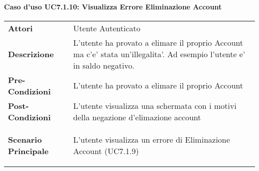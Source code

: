 \paragraph{Caso d'uso UC7.1.10:  Visualizza Errore Eliminazione Account}
\label{UC7_1_10}

\begin{tabular}{ l | p{11cm}}
	\hline
	\rowcolor{Gray}
	 \multicolumn{2}{c}{UC7.1.10 - Visualizza Errore Eliminazione Account} \\
	 \hline
	\textbf{Attori} & Utente Autenticato \\
	\textbf{Descrizione} & L'utente ha provato a elimare il proprio Account ma c'e' stata un'illegalita'. Ad esempio l'utente e' in saldo negativo.\\
	\textbf{Pre-Condizioni} & L'utente ha provato a elimare il proprio Account\\
	\textbf{Post-Condizioni} & L'utente visualizza una schermata con i motivi della negazione d'elimazione account\\
	\textbf{Scenario Principale} & 
	\begin{enumerate*}[label=(\arabic*.),itemjoin={\newline}]
		\item L'utente visualizza un errore di Eliminazione Account (UC7.1.9)
	\end{enumerate*}\\
\end{tabular}